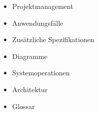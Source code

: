 \begin{itemize}
	\item Projektmanagement
	\item Anwendungsfälle
	\item Zusätzliche Spezifikationen
	\item Diagramme
	\item Systemoperationen
	\item Architektur
	\item Glossar
\end{itemize}
